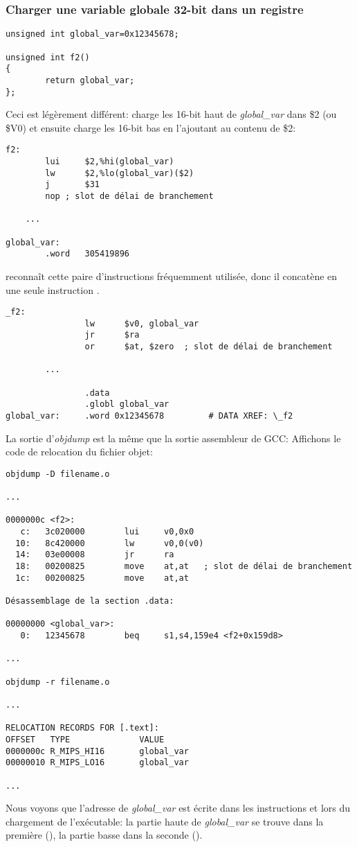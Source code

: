 \subsubsection{Charger une variable globale 32-bit dans un registre}

\begin{lstlisting}[style=customc]
unsigned int global_var=0x12345678;

unsigned int f2()
{
        return global_var;
};
\end{lstlisting}


Ceci est légèrement différent:  charge les 16-bit haut de \emph{global\_var}
dans \$2 (ou \$V0) et ensuite  charge les 16-bit bas en l'ajoutant au contenu
de \$2:

\begin{lstlisting}[caption=GCC 4.4.5 -O3 (\assemblyOutput),style=customasmMIPS]
f2:
        lui     $2,%hi(global_var)
        lw      $2,%lo(global_var)($2)
        j       $31
        nop	; slot de délai de branchement

	...

global_var:
        .word   305419896
\end{lstlisting}

\IDA reconnaît cette paire d'instructions fréquemment utilisée, donc il concatène en
une seule instruction .

\begin{lstlisting}[caption=GCC 4.4.5 -O3 (IDA),style=customasmMIPS]
_f2:
                lw      $v0, global_var
                jr      $ra
                or      $at, $zero	; slot de délai de branchement

		...

                .data
                .globl global_var
global_var:     .word 0x12345678         # DATA XREF: \_f2
\end{lstlisting}

La sortie d'\emph{objdump} est la même que la sortie assembleur de GCC:
Affichons le code de relocation du fichier objet:

\begin{lstlisting}[caption=objdump,style=customasmMIPS]
objdump -D filename.o

...

0000000c <f2>:
   c:   3c020000        lui     v0,0x0
  10:   8c420000        lw      v0,0(v0)
  14:   03e00008        jr      ra
  18:   00200825        move    at,at	; slot de délai de branchement
  1c:   00200825        move    at,at

Désassemblage de la section .data:

00000000 <global_var>:
   0:   12345678        beq     s1,s4,159e4 <f2+0x159d8>

...

objdump -r filename.o

...

RELOCATION RECORDS FOR [.text]:
OFFSET   TYPE              VALUE
0000000c R_MIPS_HI16       global_var
00000010 R_MIPS_LO16       global_var

...

\end{lstlisting}

Nous voyons que l'adresse de \emph{global\_var} est écrite dans les instructions 
et  lors du chargement de l'exécutable:
la partie haute de \emph{global\_var} se trouve dans la première (), la partie
basse dans la seconde ().

